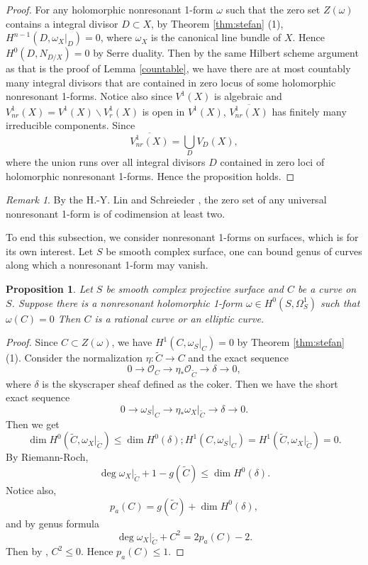 \documentclass[12pt,reqno]{amsart}
\newtheorem{proposition}[theorem]{Proposition}
\theoremstyle{question}
\theoremstyle{definition}
\theoremstyle{remark}
\newtheorem{remark}[theorem]{Remark}
\theoremstyle{cited}
\theoremstyle{citeddef}
\begin{document}
 \begin{proof}
For any holomorphic nonresonant 1-form $\omega$ such that the zero set $Z(\omega)$ contains a integral divisor $D\subset X$, by Theorem \ref{thm:stefan} (1), $H^{n-1}(D, {\omega_X}|_D)=0$, where $\omega_X$ is the canonical line bundle of $X$. Hence $H^0(D, N_{D/X})=0$ by Serre duality. Then by the same Hilbert scheme argument as that is the proof of   Lemma \ref{countable}, we have there are at most countably many integral divisors that are contained in zero locus of some holomorphic nonresonant 1-forms.  Notice also since $V^1(X)$ is algebraic and $V^1_{nr}(X)=V^1(X)\backslash V_r^1(X)$ is open in $V^1(X)$, $\overline{V_{nr}^1(X)}$ has finitely many irreducible components. Since $$\overline{V_{nr}^1(X)}=\bigcup_{D}V_D(X),$$ where the union runs over all integral divisors $D$ contained in zero loci of holomorphic nonresonant 1-forms. Hence the proposition holds.
 \end{proof}
 
 \begin{remark}
By the H.-Y. Lin and Schreieder \cite[appendix]{SS19}, the zero set of any universal nonresonant 1-form is of codimension at least two. 
 \end{remark}

 To end this subsection, we consider nonresonant 1-forms on surfaces, which is for its own interest. Let $S$ be smooth complex surface, one can bound genus of curves along which a nonresonant 1-form may vanish.
 
 \begin{proposition}
 Let $S$ be smooth complex projective surface and $C$ be a curve on $S$. Suppose there is a nonresonant holomorphic 1-form $\omega\in H^0(S, \Omega_S^1)$ such that $\omega(C)=0$ Then $C$ is a rational curve or an elliptic curve.
 \end{proposition}
 
 
 \begin{proof}
 Since $C\subset Z(\omega)$, we have $H^1(C, {\omega_S}|_C)=0$ by Theorem \ref{thm:stefan} (1). Consider the normalization $\eta: \widetilde{C}\to C$ and the exact sequence $$0\to \mathcal{O}_C\to \eta_*\mathcal{O}_{\widetilde{C}}\to \delta\to 0, $$ where $\delta$ is the skyscraper sheaf defined as the coker. Then we have the short exact sequence $$0\to {\omega_S}|_C\to \eta_*{{\omega_X}|_{\widetilde{C}}}\to \delta\to 0.$$ Then we get $$\dim H^0(\widetilde{C}, {\omega_X}|_{\widetilde{C}})\leq \dim H^0(\delta);   H^1(C, {\omega_S}|_C)=H^1(\widetilde{C}, {\omega_X}|_{\widetilde{C}})=0.$$ By Riemann-Roch, $$\deg {\omega_X}|_{\widetilde{C}}+1-g(\widetilde{C})\leq \dim H^0(\delta).$$ Notice also, $$p_a(C)=g(\widetilde{C})+\dim H^0(\delta), $$ and by genus formula $$\deg {\omega_X}|_{\widetilde{C}}+C^2=2p_a(C)-2.$$ Then by \cite[Theorem 1]{Sp88}, $C^2\leq 0$. Hence $p_a(C)\leq1$.
 \end{proof}
 
\end{document}
